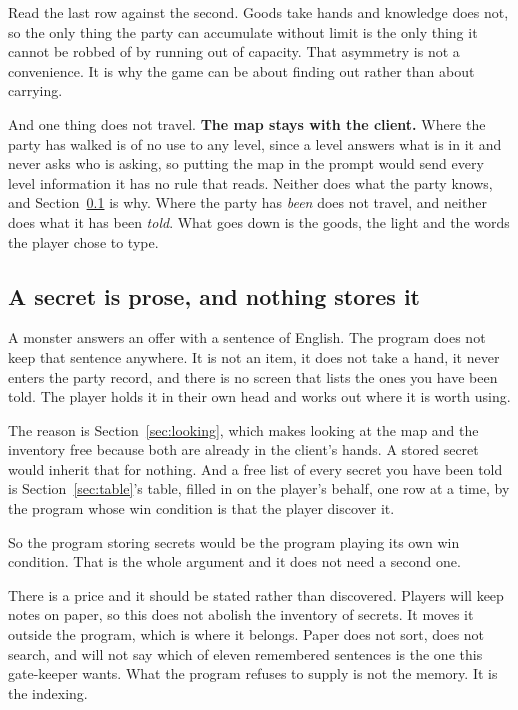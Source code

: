\documentclass[11pt,a4paper]{article}
\begin{document}
\begin{sectionbox}
Read the last row against the second. Goods take hands and knowledge does not, so the only thing
the party can accumulate without limit is the only thing it cannot be robbed of by running out of
capacity. That asymmetry is not a convenience. It is why the game can be about finding out rather
than about carrying.
\end{sectionbox}

\begin{alarmbox}
And one thing does not travel. \textbf{The map stays with the client.} Where the party has walked
is of no use to any level, since a level answers what is in it and never asks who is asking, so
putting the map in the prompt would send every level information it has no rule that reads. Neither
does what the party knows, and Section~\ref{sec:prose} is why. Where the party has \emph{been} does
not travel, and neither does what it has been \emph{told}. What goes down is the goods, the light
and the words the player chose to type.
\end{alarmbox}

\subsection{A secret is prose, and nothing stores it}
\label{sec:prose}

A monster answers an offer with a sentence of English. The program does not keep that sentence
anywhere. It is not an item, it does not take a hand, it never enters the party record, and there
is no screen that lists the ones you have been told. The player holds it in their own head and
works out where it is worth using.

The reason is Section~\ref{sec:looking}, which makes looking at the map and the inventory free
because both are already in the client's hands. A stored secret would inherit that for nothing. And
a free list of every secret you have been told is Section~\ref{sec:table}'s table, filled in on the
player's behalf, one row at a time, by the program whose win condition is that the player discover
it.

\begin{sectionbox}
So the program storing secrets would be the program playing its own win condition. That is the
whole argument and it does not need a second one.
\end{sectionbox}

There is a price and it should be stated rather than discovered. Players will keep notes on paper,
so this does not abolish the inventory of secrets. It moves it outside the program, which is where
it belongs. Paper does not sort, does not search, and will not say which of eleven remembered
sentences is the one this gate-keeper wants. What the program refuses to supply is not the memory.
It is the indexing.
\end{document}
